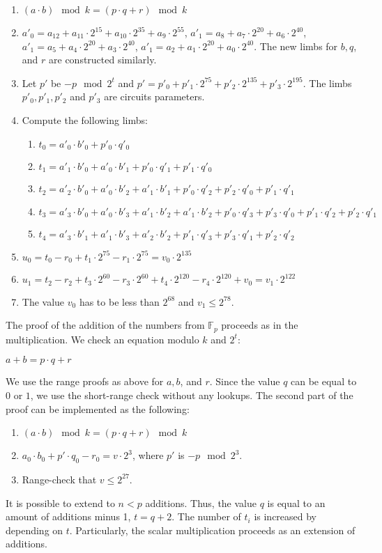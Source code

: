 \begin{enumerate}
\item $(a\cdot b) \mod k = (p \cdot q + r) \mod k$
\item $a'_0 = a_{12} + a_{11} \cdot 2^{15} + a_{10} \cdot 2^{35} + a_9 \cdot 2^{55}$, $a'_1 = a_8 + a_7 \cdot 2^{20} + a_6 \cdot 2^{40}$, $a'_1 = a_5 + a_4 \cdot 2^{20} + a_3 \cdot 2^{40}$, $a'_1 = a_2 + a_1 \cdot 2^{20} + a_0 \cdot 2^{40}$.
The new limbs for  $b, q$, and $r$ are constructed similarly.
\item Let $p'$ be $-p \mod 2^t$ and $p' = p'_{0} + p'_{1}\cdot 2^{75} + p'_2 \cdot 2^{135}+ p'_3 \cdot 2^{195}$. The limbs $p'_0, p'_1, p'_2$ and $p'_3$ are circuits parameters.
\item Compute the following limbs:
	\begin{enumerate}
	\item $t_0 = a'_0 \cdot b'_0 + p'_0 \cdot q'_0$
	\item $t_1 = a'_1 \cdot b'_0 + a'_0 \cdot b'_1 + p'_0 \cdot q'_1 + p'_1 \cdot q'_0$
	\item $t_2 = a'_2 \cdot b'_0 + a'_0 \cdot b'_2 + a'_1 \cdot b'_1 + p'_0 \cdot q'_2 + p'_2 \cdot q'_0+ p'_1 		\cdot q'_1$
	\item $t_3 = a'_3 \cdot b'_0 + a'_0 \cdot b'_3 + a'_1 \cdot b'_2 + a'_1 \cdot b'_2 + p'_0 \cdot q'_3 + p'_3 	\cdot q'_0+ p'_1 \cdot q'_2 + p'_2 \cdot q'_1$
	\item $t_4 = a'_3 \cdot b'_1 + a'_1 \cdot b'_3 + a'_2 \cdot b'_2 + p'_1 \cdot q'_3 + p'_3 \cdot q'_1+ p'_2 			\cdot q'_2$
	\end{enumerate}
\item $u_0 = t_0 - r_0 + t_1 \cdot 2^{75} - r_1 \cdot 2^{75} = v_0 \cdot 2^{135}$
\item $u_1 = t_2 - r_2 + t_3 \cdot 2^{60} - r_3 \cdot 2^{60} + t_4 \cdot 2^{120} - r_4 \cdot 2^{120} + v_0 = v_1 \cdot 2^{122}$
\item The value $v_0$ has to be less than $2^{68}$ and $v_1 \le 2^{78}$.
\end{enumerate}

The proof of the addition of the numbers from $\mathbb{F}_p$ proceeds as in the multiplication.
We check an equation modulo $k$ and $2^t$:
\begin{center}
$a + b = p\cdot q + r$
\end{center}
We use the range proofs as above for $a, b$, and $r$.
Since the value $q$ can be equal to $0$ or $1$, we use the short-range check without any lookups.
The second part of the proof can be implemented as the following:
\begin{enumerate}
\item $(a\cdot b) \mod k = (p \cdot q + r) \mod k$
\item $a_0 \cdot b_0 + p'\cdot q_0 - r_0 = v \cdot 2^3$, where $p'$ is $- p \mod 2^3$.
\item Range-check that $v \leq 2^{27}$.
\end{enumerate} 
It is possible to extend to $n < p$ additions.
Thus, the value $q$ is equal to an amount of additions minus 1, $t = q + 2$.
The number of $t_i $ is increased by depending on $t$.
Particularly, the scalar multiplication proceeds as an extension of additions.

